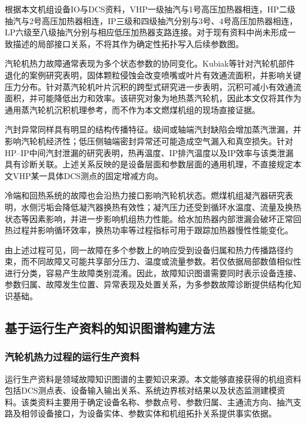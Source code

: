 根据本文机组设备IO与DCS资料，VHP一级抽汽与1号高压加热器相连，HP二级抽汽与2号高压加热器相连，IP三级和四级抽汽分别与3号、4号高压加热器相连，LP六级至八级抽汽分别与相应低压加热器支路连接。对于现有资料中尚未形成一致描述的局部接口关系，不将其作为确定性拓扑写入后续参数图。

汽轮机热力故障通常表现为多个状态参数的协同变化。Kubiak等针对汽轮机部件退化的案例研究表明，固体颗粒侵蚀会改变喷嘴或叶片有效通流面积，并影响关键压力分布\cite{Kubiak2002TurbineDegradation}。针对蒸汽轮机叶片沉积的跨型式研究进一步表明，沉积可减小有效通流面积，并可能降低出力和效率\cite{Kubiak2002ScaleDeposit}。该研究对象为地热蒸汽轮机，因此本文仅将其作为通用蒸汽轮机沉积机理参考，而不作为本文燃煤机组的现场直接证据。

汽封异常同样具有明显的结构传播特征。级间或轴端汽封缺陷会增加蒸汽泄漏，并影响汽轮机经济性；低压侧轴端密封异常还可能造成空气漏入和真空损失\cite{ZhangHu2021FaultPropagationGNN}。针对HP--IP中间汽封泄漏的研究表明，热再温度、IP排汽温度以及IP效率与该类泄漏具有诊断关联\cite{Xu2011HPIPLeakage}。上述关系反映的是设备层面和参数层面的通用机理，不直接规定本文VHP某一具体DCS测点的固定增减方向。

冷端和回热系统的故障也会沿热力接口影响汽轮机状态。燃煤机组凝汽器研究表明，水侧污垢会降低凝汽器换热有效性；凝汽压力还受到循环水温度、流量及换热状态等因素影响，并进一步影响机组热力性能\cite{Li2016CondenserFouling,Medica2018CondenserCondition}。给水加热器内部泄漏会破坏正常回热过程并影响循环效率，换热功率等过程指标可用于跟踪加热器慢性性能变化\cite{Heo2012FWHLeakage,Barszcz2011FeedwaterHeater}。

由上述过程可见，同一故障在多个参数上的响应受到设备归属和热力传播路径约束，而不同故障又可能共享部分压力、温度或流量参数。若仅依据局部数值相似性进行分类，容易产生故障类别混淆。因此，故障知识图谱需要同时表示设备连接、参数归属、故障发生位置、异常表现及处置关系，为多参数故障诊断提供结构化知识基础。

\subsection{基于运行生产资料的知识图谱构建方法}
\label{subsec:kg_construction_v7}

\subsubsection{汽轮机热力过程的运行生产资料}
\label{subsubsec:operation_materials_v7}

运行生产资料是领域故障知识图谱的主要知识来源。本文能够直接获得的机组资料包括DCS测点表、设备输入输出关系、系统边界核对结果以及状态监测建模资料。该类资料主要用于确定设备名称、参数点号、参数归属、主通流方向、抽汽支路及相邻设备接口，为设备实体、参数实体和机组拓扑关系提供事实依据。

